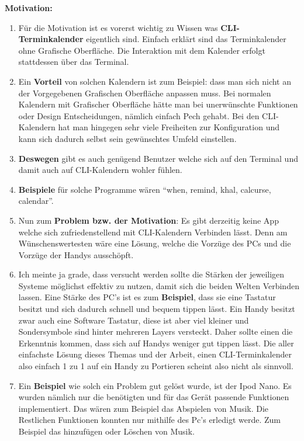 {	\myNewSection
	\textbf{Motivation:} \myCheckmark
	\begin{enumerate}
		\item Für die Motivation ist es vorerst wichtig zu Wissen was \textbf{CLI-Terminkalender} eigentlich sind. Einfach erklärt sind das Terminkalender ohne Grafische Oberfläche. Die Interaktion mit dem Kalender erfolgt stattdessen über das Terminal.
		\item Ein \textbf{Vorteil} von solchen Kalendern ist zum Beispiel: dass man sich nicht an der Vorgegebenen Grafischen Oberfläche anpassen muss. Bei normalen Kalendern mit Grafischer Oberfläche hätte man bei unerwünschte Funktionen oder Design Entscheidungen, nämlich einfach Pech gehabt. Bei den CLI-Kalendern hat man hingegen sehr viele Freiheiten zur Konfiguration und kann sich dadurch selbst sein gewünschtes Umfeld einstellen. 
		\item \textbf{Deswegen} gibt es auch genügend Benutzer welche sich auf den Terminal und damit auch auf CLI-Kalendern wohler fühlen. 
		\item \textbf{Beispiele} für solche Programme wären “when, remind, khal, calcurse, calendar”.
		\item Nun zum \textbf{Problem bzw. der Motivation}: Es gibt derzeitig keine App welche sich zufriedenstellend mit CLI-Kalendern Verbinden lässt. Denn am Wünschenswertesten wäre eine Lösung, welche die Vorzüge des PCs und die Vorzüge der Handys ausschöpft.
		\item Ich meinte ja grade, dass versucht werden sollte die Stärken der jeweiligen Systeme möglichst effektiv zu nutzen, damit sich die beiden Welten Verbinden lassen. Eine Stärke des PC’s ist es zum \textbf{Beispiel}, dass sie eine Tastatur besitzt und sich dadurch schnell und bequem tippen lässt. Ein Handy besitzt zwar auch eine Software Tastatur, diese ist aber viel kleiner und Sondersymbole sind hinter mehreren Layers versteckt. Daher sollte einen die Erkenntnis kommen, dass sich auf Handys weniger gut tippen lässt. Die aller einfachste Lösung dieses Themas und der Arbeit, einen CLI-Terminkalender also einfach 1 zu 1 auf ein Handy zu Portieren scheint also nicht als sinnvoll.
		\item Ein \textbf{Beispiel} wie solch ein Problem gut gelöst wurde, ist der Ipod Nano. Es wurden nämlich nur die benötigten und für das Gerät passende Funktionen implementiert. Das wären zum Beispiel das Abspielen von Musik. Die Restlichen Funktionen konnten nur mithilfe des Pc’s erledigt werde. Zum Beispiel das hinzufügen oder Löschen von Musik.

\end{enumerate}}
